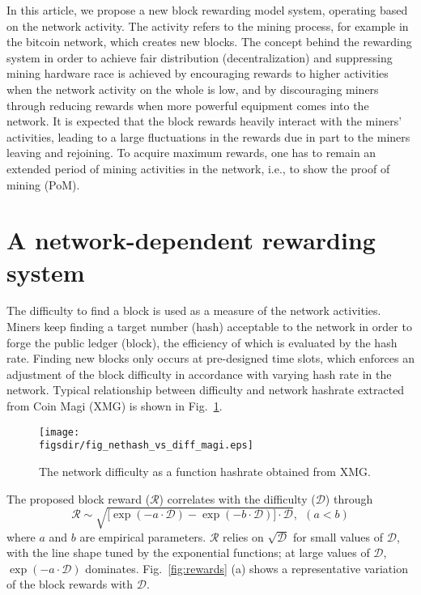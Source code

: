 \documentclass[aps,prl,reprint,showpacs,groupedaddress,letterpaper]{revtex4-1}
\def\figsdir{.}
\def\figwidth{3.in}
\newcommand{\pom}{PoM}
\newcommand{\bigdelim}[3]{\bigl#1#3\bigr#2}
\begin{document}
In this article, we propose a new block rewarding model system, operating based on the network activity. The activity refers to the mining process, for example in the bitcoin network, which creates new blocks. The concept behind the rewarding system in order to achieve fair distribution (decentralization) and suppressing mining hardware race is achieved by encouraging rewards to higher activities when the network activity on the whole is low, and by discouraging miners through reducing rewards when more powerful equipment comes into the network. It is expected that the block rewards heavily interact with the miners' activities, leading to a large fluctuations in the rewards due in part to the miners leaving and rejoining. To acquire maximum rewards, one has to remain an extended period of mining activities in the network, i.e., to show the proof of mining (\pom). 

\section{A network-dependent rewarding system}

The difficulty to find a block is used as a measure of the network activities. Miners keep finding a target number (hash) acceptable to the network in order to forge the public ledger (block), the efficiency of which is evaluated by the hash rate. Finding new blocks only occurs at pre-designed time slots, which enforces an adjustment of the block difficulty in accordance with varying hash rate in the network. Typical relationship between difficulty and network hashrate extracted from Coin Magi (XMG) \cite{Magi.url} is shown in Fig.~\ref{fig:xmg.nethash}. 

\begin{figure}[!h]
\texttt{[image: \\figsdir/fig\_nethash\_vs\_diff\_magi.eps]}
\caption{\label{fig:xmg.nethash} The network difficulty as a function hashrate obtained from XMG. \cite{Magi.url}
}
\end{figure}

The proposed block reward ($\mathcal{R}$) correlates with the difficulty ($\mathcal{D}$) through
\begin{equation}\label{eq:reward}
\mathcal{R}
\sim\sqrt{\bigdelim{[}{]}{\exp(-a\cdot\mathcal{D})-\exp(-b\cdot\mathcal{D})}\cdot\mathcal{D}},~~(a < b)
\end{equation}
where $a$ and $b$ are empirical parameters. $\mathcal{R}$ relies on $\sqrt{\mathcal{D}}$ for small values of $\mathcal{D}$, with the line shape tuned by the exponential functions; at large values of $\mathcal{D}$, $\exp(-a\cdot\mathcal{D})$ dominates. Fig.~\ref{fig:rewards} (a) shows a representative variation of the block rewards with $\mathcal{D}$. 
\end{document}

